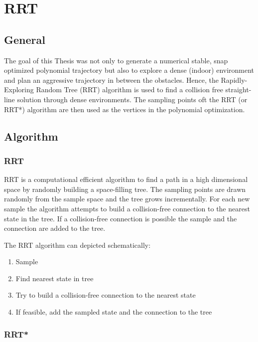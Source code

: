 \chapter{RRT}\label{chap:RRT}

\section{General}

The goal of this Thesis was not only to generate a numerical stable, snap optimized polynomial trajectory but also to explore a dense (indoor) environment and plan an aggressive trajectory in between the obstacles. Hence, the Rapidly-Exploring Random Tree (RRT) algorithm is used to find a collision free straight-line solution through dense environments. The sampling points oft the RRT (or RRT*) algorithm are then used as the vertices in the polynomial optimization.

\section{Algorithm}

\subsection{RRT}

RRT is a computational efficient algorithm to find a path in a high dimensional space by randomly building a space-filling tree. The sampling points are drawn randomly from the sample space and the tree grows incrementally. 
For each new sample the algorithm attempts to build a collision-free connection to the nearest state in the tree. If a collision-free connection is possible the sample and the connection are added to the tree. \newline

The RRT algorithm can depicted schematically:


\begin{enumerate}
  \item Sample
  \item Find nearest state in tree
  \item Try to build a collision-free connection to the nearest state
  \item If feasible, add the sampled state and the connection to the tree
\end{enumerate}

\subsection{RRT*}

